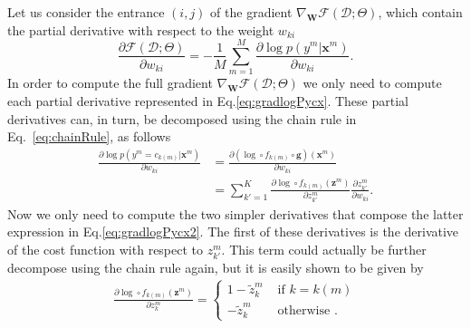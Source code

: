 Let us consider the entrance $(i,j)$ of the gradient
$\nabla_\mathbf{W}\mathcal{F}(\mathcal{D};\Theta)$, which contain the partial derivative with respect to the weight $w_{ki}$
%
\begin{equation}
\frac{\partial \mathcal{F}(\mathcal{D};\Theta)}{\partial w_{ki}} =-\frac{1}{M}\sum_{m=1}^{M} \frac{\partial \log p(y^m | \mathbf{x}^m) }{\partial w_{ki}}.
\label{eq:gradlogPycx}
\end{equation}
%
In order to compute the full gradient $\nabla_\mathbf{W}\mathcal{F}(\mathcal{D};\Theta)$ we only need to compute each partial derivative represented in Eq.\ref{eq:gradlogPycx}. These partial derivatives can, in turn, be decomposed using the chain rule in Eq.~\ref{eq:chainRule}, as follows
%
\begin{align}
\frac{\partial \log p(y^m=c_{k(m)} | \mathbf{x}^m) }{\partial w_{ki}} & = \frac{\partial (\log \circ f_{k(m)} \circ \mathbf{g})(\mathbf{x}^m) }{\partial w_{ki}}\nonumber\\ & = \sum_{k'=1}^{K}\frac{\partial \log \circ f_{k(m)}(\mathbf{z}^m)}{\partial z^m_{k'}}\frac{\partial z^m_{k'}}{\partial w_{ki}}.
\label{eq:gradlogPycx2}
\end{align}
%
Now we only need to compute the two simpler derivatives that compose the latter expression in Eq.\ref{eq:gradlogPycx2}. The first of these derivatives %
is the derivative of the cost function with respect to $z^m_{k'}$. This term
could actually be further
decompose using the chain rule again, but it is easily shown to be given by
%
\begin{align}
\frac{\partial \log \circ f_{k(m)}(\mathbf{z}^m)}{\partial z^m_{k}} = 
  \begin{cases}
      1 - \tilde{z}_k^m  &  \mbox{ if } k = k(m)\\ 
      -\tilde{z}_k^m    &  \mbox{ otherwise }.
  \end{cases}
  \label{eq:patialSoftmax}
\end{align}
